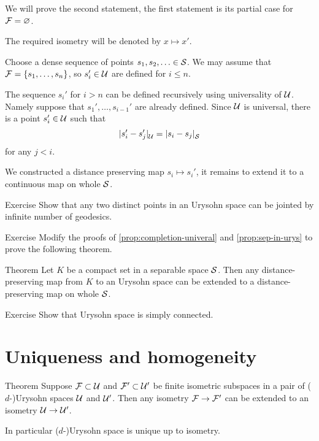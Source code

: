 We will prove the second statement,
the first statement is its partial case for $\mathcal{F}=\varnothing$.

The required isometry will be denoted by $x\mapsto x'$.

Choose a dense sequence of points $s_1,s_2,\dotsc\in\mathcal{S}$.
We may assume that $\mathcal{F}=\{s_1,\dots,s_n\}$, so $s_i'\in \mathcal{U}$ are defined for $i\le n$.

The sequence $s_i'$ for $i>n$ can be defined recursively using universality of $\mathcal{U}$.
Namely suppose that $s_1',\dots,s_{i-1}'$ are already defined.
Since $\mathcal{U}$ is universal, there is a point $s_i'\in \mathcal{U}$ such that
\[\dist{s_i'}{s_j'}{\spc{U}}=\dist{s_i}{s_j}{\spc{S}}\]
for any $j<i$.

We constructed a distance preserving map $s_i\mapsto s_i'$, it remains to extend it to a continuous map on whole $\mathcal{S}$.
\qeds

\begin{thm}{Exercise}\label{ex:geodesics-urysohn}
Show that any two distinct points in an Urysohn space can be jointed by infinite number of geodesics.
\end{thm}

\begin{thm}{Exercise}\label{ex:compact-extension}
Modify the proofs of \ref{prop:completion-univeral} and \ref{prop:sep-in-urys} to prove the following theorem.
\end{thm}

\begin{thm}{Theorem}\label{thm:compact-extension}
Let $K$ be a compact set in a separable space $\mathcal{S}$.
Then any distance-preserving map from $K$ to an Urysohn space can be extended to 
a distance-preserving map on whole $\mathcal{S}$.
\end{thm}

\begin{thm}{Exercise}\label{ex:sc-urysohn}
Show that Urysohn space is simply connected.
\end{thm}

\section{Uniqueness and homogeneity}

\begin{thm}{Theorem}\label{thm:urysohn-unique}
Suppose $\mathcal{F}\subset \mathcal{U}$ and $\mathcal{F}'\subset \mathcal{U}'$ be finite isometric subspaces in a pair of ($d$-)Urysohn spaces $\mathcal{U}$ and $\mathcal{U}'$.
Then any isometry $\mathcal{F}\to \mathcal{F}'$ can be extended to an isometry $\mathcal{U}\to \mathcal{U}'$.

In particular ($d$-)Urysohn space is unique up to isometry.
\end{thm}

